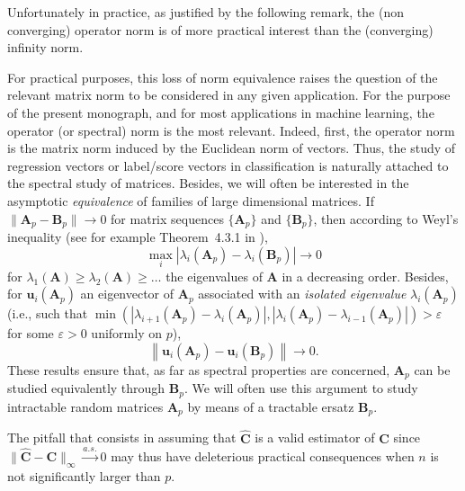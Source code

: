 \documentclass[MAL,biber]{nowfnt} %
\newcommand{\asto}{{ \xrightarrow{a.s.} }}
\newcommand{\A}{{\mathbf{A}}}
\newcommand{\B}{{\mathbf{B}}}
\newcommand{\C}{{\mathbf{C}}}
\newcommand{\uu}{{\mathbf{u}}}
\begin{document}
Unfortunately in practice, as justified by the following remark, the (non converging) operator norm is of more practical interest than the (converging) infinity norm.
\begin{remark}\label{rem:operator-norm}
For practical purposes, this loss of norm equivalence raises the question of the relevant matrix norm to be considered in any given application. For the purpose of the present monograph, and for most applications in machine learning, the operator (or spectral) norm is the most relevant. Indeed, first, the operator norm is the matrix norm induced by the Euclidean norm of vectors. Thus, the study of regression vectors or label/score vectors in classification is naturally attached to the spectral study of matrices. Besides, we will often be interested in the asymptotic \emph{equivalence} of families of large dimensional matrices. If $\|\A_p-\B_p\|\to 0$ for matrix sequences $\{\A_p\}$ and $\{\B_p\}$, then according to Weyl's inequality (see for example Theorem~4.3.1 in \citep{horn2012matrix}),
\begin{equation*}
    \max_i \left| \lambda_i(\A_p) -\lambda_i(\B_p) \right| \to 0
\end{equation*}
for $\lambda_1(\A)\geq \lambda_2(\A)\geq \ldots$ the eigenvalues of $\A$ in a decreasing order. Besides, for $\uu_i(\A_p)$ an eigenvector of $\A_p$ associated with an \emph{isolated eigenvalue} $\lambda_i(\A_p)$ (i.e., such that $\min ( |\lambda_{i+1}(\A_p)-\lambda_i(\A_p) |,|\lambda_i(\A_p)-\lambda_{i-1} (\A_p) | )>\varepsilon$ for some $\varepsilon>0$ uniformly on $p$),
\begin{equation*}
    \left\| \uu_i(\A_p) -\uu_i(\B_p) \right\| \to 0.
\end{equation*}
These results ensure that, as far as spectral properties are concerned, $\A_p$ can be studied equivalently through $\B_p$. We will often use this argument to study intractable random matrices $\A_p$ by means of a tractable ersatz $\B_p$.

The pitfall that consists in assuming that $\hat\C$ is a valid estimator of $\C$ since $\|\hat \C-\C\|_\infty \asto 0$ may thus have deleterious practical consequences when $n$ is not significantly larger than $p$.
\end{remark}
\end{document}
